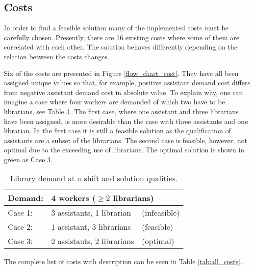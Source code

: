     


\subsection{Costs}
In order to find a feasible solution many of the implemented costs must be carefully chosen. Presently, there are 16 existing costs where some of them are correlated with each other. The solution behaves differently depending on the relation between the costs changes.

Six of the costs are presented in Figure \ref{flow_chart_cost}. They have all been assigned unique values so that, for example, positive assistant demand cost differs from negative assistant demand cost in absolute value. To explain why, one can imagine a case where four workers are demanded of which two have to be librarians, see Table \ref{library_solutions}. The first case, where one assistant and three librarians have been assigned, is more desirable than the case with three assistants and one librarian. In the first case it is still a feasible solution as the qualification of assistants are a subset of the librarians. The second case is feasible, however, not optimal due to the exceeding use of librarians. The optimal solution is shown in green as Case 3.

\begin{table}[!h]
\centering
\caption{Library demand at a shift and solution qualities.}
\label{library_solutions}
\begin{tabular}{|l|l|l|}
\hline
\rowcolor[HTML]{C0C0C0} 
Demand:                         & \multicolumn{2}{l|}{\cellcolor[HTML]{C0C0C0}4 workers ($\geq 2$ librarians)} \\ \hline
\rowcolor[HTML]{FD6864} 
\cellcolor[HTML]{C0C0C0}Case 1: & 3 assistants, 1 librarian                  & (infeasible)                 \\ \hline
\rowcolor[HTML]{FFFE65} 
\cellcolor[HTML]{C0C0C0}Case 2: & 1 assistant, 3 librarians                  & (feasible)                     \\ \hline
\rowcolor[HTML]{34FF34} 
\cellcolor[HTML]{C0C0C0}Case 3:  & 2 assistants, 2 librarians                 & (optimal)                      \\ \hline
\end{tabular}
\end{table}

The complete list of costs with description can be seen in Table \ref{tab:all_costs}. 

